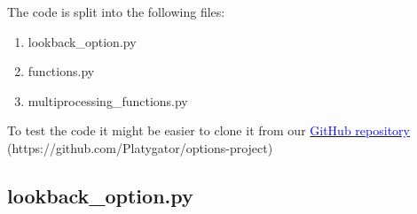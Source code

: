 The code is split into the following files:

\begin{enumerate}
    \item lookback\_option.py
    \item functions.py
    \item multiprocessing\_functions.py
\end{enumerate}

To test the code it might be easier to clone it from our \href{https://github.com/Platygator/options-project}{\textcolor{blue}{GitHub repository}} \\ (https://github.com/Platygator/options-project)

\subsection{lookback\_option.py}

